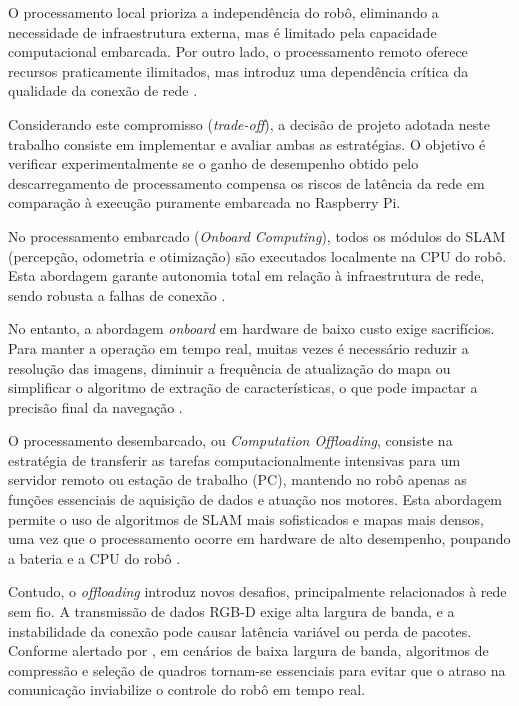 O processamento local prioriza a independência do robô, eliminando a necessidade de infraestrutura externa, mas é limitado pela capacidade computacional embarcada. Por outro lado, o processamento remoto oferece recursos praticamente ilimitados, mas introduz uma dependência crítica da qualidade da conexão de rede \cite{li2021highefficientmultirobot}.

Considerando este compromisso (\textit{trade-off}), a decisão de projeto adotada neste trabalho consiste em implementar e avaliar ambas as estratégias. O objetivo é verificar experimentalmente se o ganho de desempenho obtido pelo descarregamento de processamento compensa os riscos de latência da rede em comparação à execução puramente embarcada no Raspberry Pi.

No processamento embarcado (\textit{Onboard Computing}), todos os módulos do SLAM (percepção, odometria e otimização) são executados localmente na CPU do robô. Esta abordagem garante autonomia total em relação à infraestrutura de rede, sendo robusta a falhas de conexão \cite{canovas2021onboarddynamicrgbd}.

No entanto, a abordagem \textit{onboard} em hardware de baixo custo exige sacrifícios. Para manter a operação em tempo real, muitas vezes é necessário reduzir a resolução das imagens, diminuir a frequência de atualização do mapa ou simplificar o algoritmo de extração de características, o que pode impactar a precisão final da navegação \cite{canovas2021onboarddynamicrgbd, costa2019characterizingpolybenchgpu}.

O processamento desembarcado, ou \textit{Computation Offloading}, consiste na estratégia de transferir as tarefas computacionalmente intensivas para um servidor remoto ou estação de trabalho (PC), mantendo no robô apenas as funções essenciais de aquisição de dados e atuação nos motores. Esta abordagem permite o uso de algoritmos de SLAM mais sofisticados e mapas mais densos, uma vez que o processamento ocorre em hardware de alto desempenho, poupando a bateria e a CPU do robô \cite{li2021highefficientmultirobot}.

Contudo, o \textit{offloading} introduz novos desafios, principalmente relacionados à rede sem fio. A transmissão de dados RGB-D exige alta largura de banda, e a instabilidade da conexão pode causar latência variável ou perda de pacotes. Conforme alertado por , em cenários de baixa largura de banda, algoritmos de compressão e seleção de quadros tornam-se essenciais para evitar que o atraso na comunicação inviabilize o controle do robô em tempo real.


